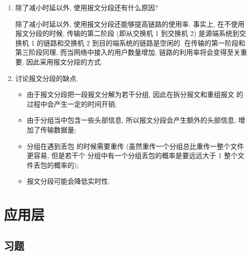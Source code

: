 \documentclass[10pt,UTF8]{ctexbook} %
\begin{document}
\begin{example}
\begin{enumerate}[label={$\left.\mathrm{\alph*}\right)$}, itemsep=0pt]
        \item 除了减小时延以外, 使用报文分段还有什么原因?
        \begin{sol}
            除了减小时延以外, 使用报文分段还能够提高链路的使用率. 事实上,
            在不使用报文分段的时候, 传输的第二阶段 (即从交换机 1 到交换机 2)
            是源端系统到交换机 1 的链路和交换机 2 到目的端系统的链路是空闲的.
            在传输的第一阶段和第三阶段同理, 而当网络中接入的用户数量增加,
            链路的利用率将会变得至关重要, 因此采用报文分段的方式.
        \end{sol}
        \item 讨论报文分段的缺点.
        \begin{itemize}[itemsep=0pt]
            \item 由于报文分段把一段报文分解为若干分组, 因此在拆分报文和重组报文
            的过程中会产生一定的时间开销;
            \item 由于分组当中包含一些头部信息, 所以报文分段会产生额外的头部信息, 
            增加了传输数据量; 
            \item 分组在遇到丢包
            的时候需要重传 (虽然重传一个分组总比重传一整个文件更容易, 但是若干个
            分组中有一个分组丢包的概率是要远远大于 1 整个文件丢包的概率的);
            \item 报文分段可能会降低实时性.
        \end{itemize}
    \end{enumerate}
\end{example}

\newpage
\thispagestyle{empty}

\chapter{应用层}

\section{习题}
\end{document}
